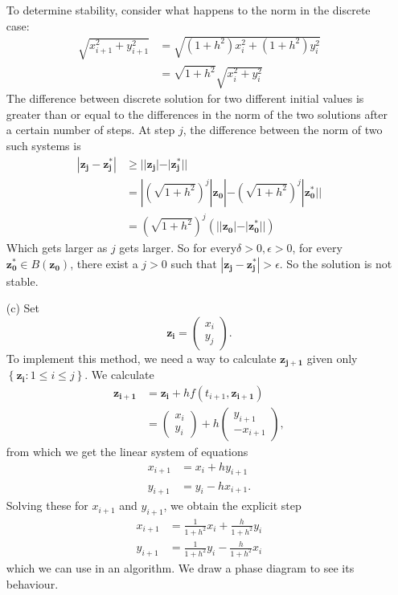 \documentclass{article}
\begin{document}
\begin{itemize}
		To determine stability, consider what happens to the norm in the
		discrete case:
		\begin{align*}
			\sqrt{x_{i+1}^2 + y_{i+1}^2} &= \sqrt{(1 + h^2) x_i^2 + (1
			+ h^2) y_i^2} \\
			&= \sqrt{1 + h^2}\sqrt{x_i^2 + y_i^2}
		\end{align*}
		The difference between discrete
		solution for two different initial values is greater than or
		equal to the differences in the norm
		of the two solutions after a certain number of steps.  At step
		$j$, the difference between the
		norm of two such systems is
		\begin{align*}
			|\mathbf{z_j} - \mathbf{z_j^*} |
			&\geq  ||\mathbf{z_j}| - |\mathbf{z_j^*}|| \\
			&= |(\sqrt{1 + h^2})^j|\mathbf{z_0}| -
			(\sqrt{1 + h^2})^j|\mathbf{z_0^*}|| \\
			&=  (\sqrt{1 + h^2})^j (||\mathbf{z_0}| -
			|\mathbf{z_0^*}||)
		\end{align*}
		Which gets larger as $j$ gets larger.
		So for every$\delta > 0, \epsilon > 0$, for every $\mathbf{z_0^*} \in
		B(\mathbf{z_0})$, there exist a $j > 0$ such that $|\mathbf{z_j}
		- \mathbf{z_j^*} | > \epsilon$. So the solution is not stable. 
	\item[(c)]
		Set
		\[
			\mathbf{z_{i}} =
			\begin{pmatrix}
				x_i \\
				y_j
			\end{pmatrix}.
		\]
		To implement this method, we need a way to calculate
		$\mathbf{z_{j+1}}$ given only $\left\{\mathbf{z_{i}} : 1 \leq i
		\leq j\right\}$. We calculate
		\begin{align*}
			\mathbf{z_{i+1}} &= \mathbf{z_{i}} + hf(t_{i+1},
			\mathbf{z_{i+1}}) \\
			&=
			\begin{pmatrix}
				x_i \\
				y_i
			\end{pmatrix}
			+ h
			\begin{pmatrix}
				y_{i+1} \\
				-x_{i+1}
			\end{pmatrix},
		\end{align*}
		from which we get the linear system of equations
		\begin{align*}
			x_{i+1} &= x_i + h y_{i+1} \\
			y_{i+1} &= y_i - h x_{i+1}.
		\end{align*}
		Solving these for $x_{i+1}$ and $y_{i+1}$, we obtain the explicit
		step
		\begin{align*}
			x_{i+1} &= \frac{1}{1 + h^2}x_i +
			\frac{h}{1+h^2} y_{i} \\
			y_{i+1} &= \frac{1}{1+h^2} y_{i} -  \frac{h}{1+h^2}x_i
		\end{align*}
		which we can use in an algorithm. We draw a phase diagram to see
		its behaviour.


\end{itemize}
\end{document}
